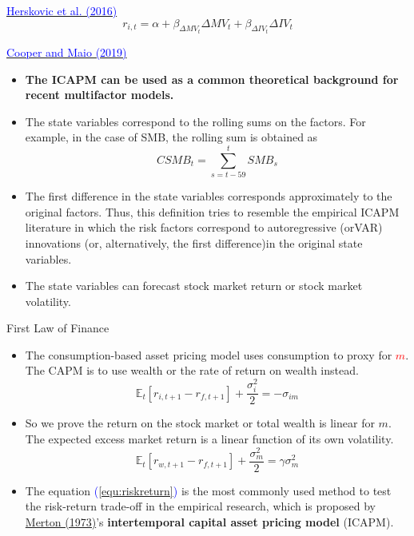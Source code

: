 \documentclass{beamer}
\begin{document}
\begin{frame}{\href{https://doi.org/10.1016/j.jfineco.2015.09.010}{\textcolor{blue}{Herskovic et al. (2016)}}}
	\begin{equation}
		r_{i,t} = \alpha + \beta_{\Delta MV_t}  \Delta MV_t + \beta_{\Delta IV_t}  \Delta IV_t
	\end{equation}
\end{frame}

\begin{frame}{\href{https://doi.org/10.1287/mnsc.2018.3036}{\textcolor{blue}{Cooper and Maio (2019)}}}
	\begin{itemize}
		\item \textbf{The ICAPM can be used as a common theoretical background for recent multifactor models.}
		\item The state variables correspond to the rolling sums on the factors. For example, in the case of SMB, the rolling sum is obtained as
		\begin{equation}
			C SMB_{t}=\sum_{s=t-59}^{t} SMB_{s}
		\end{equation}
	\item The first difference in the state variables corresponds
	approximately to the original factors. Thus, this definition tries to resemble the empirical ICAPM literature in
	which the risk factors correspond to autoregressive (orVAR) innovations (or, alternatively, the first difference)in the original state variables.
	\item The state variables can forecast stock market return or stock market volatility.
	\end{itemize}
\end{frame}



\begin{frame}{First Law of Finance}
\begin{itemize}
	\item The consumption-based asset pricing model uses consumption to proxy for \textcolor{red}{$m$}. The CAPM is to use wealth or the rate of return on wealth instead.
	\begin{equation}
		\mathbb{E}_{t}\left[r_{i, t+1}-r_{f, t+1}\right]+\frac{\sigma_{i}^{2}}{2}=-\sigma_{i m}
		\end{equation}
	\item So we prove the return on the stock market or total wealth is linear for $m$. The expected excess market return is a linear function of its own volatility.
	\begin{equation}\label{equ:riskreturn}
		\mathbb{E}_{t}\left[r_{w, t+1}-r_{f, t+1}\right]+\frac{\sigma_{m}^{2}}{2}= \gamma\sigma^2_{m}
		\end{equation}
	\item The equation \textcolor{blue}{(\ref{equ:riskreturn})} is the most commonly used method to test the risk-return trade-off in the empirical research, which is proposed by \href{https://doi.org/10.2307/1913811}{\textcolor{blue}{}Merton (1973)}'s \textbf{intertemporal capital asset pricing model} (ICAPM).
\end{itemize}
\end{frame}
\end{document}
